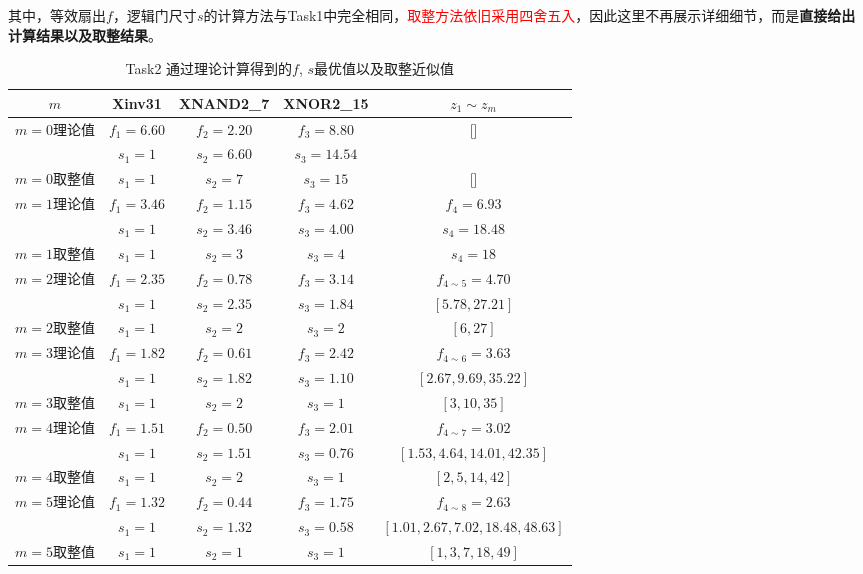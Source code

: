 \documentclass[UTF8,12pt,a4paper]{ctexart}
\begin{document}
其中，等效扇出$f$，逻辑门尺寸$s$的计算方法与Task1中完全相同，\textcolor{red}{取整方法依旧采用四舍五入}，因此这里不再展示详细细节，而是\textbf{直接给出计算结果以及取整结果}。
\begin{table}[htbp]
    \centering
    \caption{Task2 通过理论计算得到的$f$, $s$最优值以及取整近似值}
    \label{tab:task2_theo_best_sf}
    \small
    \begin{tabular}{ccccc}
    \toprule
    $m$ & Xinv31 & XNAND2\_7 & XNOR2\_15 & $z_1 \sim z_m$ \\
    \midrule
    \multirow{2}{*}{$m=0$理论值} & $f_1 = 6.60$ & $f_2 = 2.20$ & $f_3 = 8.80$ & \multirow{2}{*}{[]} \\
                                 & $s_1 = 1$ & $s_2 = 6.60$ & $s_3 = 14.54$ &  \\
    $m=0$取整值 & $s_1 = 1$ & $s_2 = 7$ & $s_3 = 15$ & [] \\
    \midrule
    \multirow{2}{*}{$m=1$理论值} & $f_1 = 3.46$ & $f_2 = 1.15$ & $f_3 = 4.62$ & $f_4 = 6.93$ \\
                                 & $s_1 = 1$ & $s_2 = 3.46$ & $s_3 = 4.00$ & $s_4 = 18.48$ \\
    $m=1$取整值 & $s_1 = 1$ & $s_2 = 3$ & $s_3 = 4$ & $s_4 = 18$ \\
    \midrule
    \multirow{2}{*}{$m=2$理论值} & $f_1 = 2.35$ & $f_2 = 0.78$ & $f_3 = 3.14$ & $f_{4\sim5} = 4.70$ \\
                                 & $s_1 = 1$ & $s_2 = 2.35$ & $s_3 = 1.84$ & $[5.78, 27.21]$ \\
    $m=2$取整值 & $s_1 = 1$ & $s_2 = 2$ & $s_3 = 2$ & $[6, 27]$ \\
    \midrule
    \multirow{2}{*}{$m=3$理论值} & $f_1 = 1.82$ & $f_2 = 0.61$ & $f_3 = 2.42$ & $f_{4\sim6} = 3.63$ \\
                                 & $s_1 = 1$ & $s_2 = 1.82$ & $s_3 = 1.10$ & $[2.67, 9.69, 35.22]$ \\
    $m=3$取整值 & $s_1 = 1$ & $s_2 = 2$ & $s_3 = 1$ & $[3, 10, 35]$ \\
    \midrule
    \multirow{2}{*}{$m=4$理论值} & $f_1 = 1.51$ & $f_2 = 0.50$ & $f_3 = 2.01$ & $f_{4\sim7} = 3.02$ \\
                                 & $s_1 = 1$ & $s_2 = 1.51$ & $s_3 = 0.76$ & $[1.53, 4.64, 14.01, 42.35]$ \\
    $m=4$取整值 & $s_1 = 1$ & $s_2 = 2$ & $s_3 = 1$ & $[2, 5, 14, 42]$ \\
    \midrule
    \multirow{2}{*}{$m=5$理论值} & $f_1 = 1.32$ & $f_2 = 0.44$ & $f_3 = 1.75$ & $f_{4\sim8} = 2.63$ \\
                                 & $s_1 = 1$ & $s_2 = 1.32$ & $s_3 = 0.58$ & $[1.01, 2.67, 7.02, 18.48, 48.63]$ \\
    $m=5$取整值 & $s_1 = 1$ & $s_2 = 1$ & $s_3 = 1$ & $[1, 3, 7, 18, 49]$ \\
    \bottomrule
    \end{tabular}
\end{table}
\end{document}
